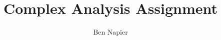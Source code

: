 \documentclass[a4paper, answers]{exam}
\title{Complex Analysis Assignment}
\author{Ben Napier}
\date{}
\begin{document}
    \maketitle
    \begin{questions}
        
        
%       
        
        
        
        
        
    \end{questions}
\end{document}
